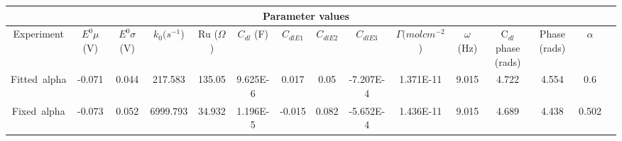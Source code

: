 \documentclass[preview]{standalone}
\begin{document}
\begin{center}
\begin{tabular}{|c|c|c|c|c|c|c|c|c|c|c|c|c|c|c|}
\hline
\multicolumn{14}{|c|}{Parameter values}\\
\hline
Experiment & $E^0 \mu$ (V) & $E^0 \sigma$ (V) & $k_0 (s^{-1}$) & Ru ($\Omega$) & $C_{dl}$ (F) & $C_{dlE1}$ & $C_{dlE2}$ & $C_{dlE3}$ & $\Gamma (mol cm^{-2}$) & $\omega$ (Hz) & C$_{dl}$ phase (rads) & Phase (rads) & $\alpha$\\
\hline
Fitted\ alpha & -0.071 & 0.044 & 217.583 & 135.05 & 9.625E-6 & 0.017 & 0.05 & -7.207E-4 & 1.371E-11 & 9.015 & 4.722 & 4.554 & 0.6\\
\hline
Fixed\ alpha & -0.073 & 0.052 & 6999.793 & 34.932 & 1.196E-5 & -0.015 & 0.082 & -5.652E-4 & 1.436E-11 & 9.015 & 4.689 & 4.438 & 0.502\\
\hline
\end{tabular}
\end{center}
\end{document}
